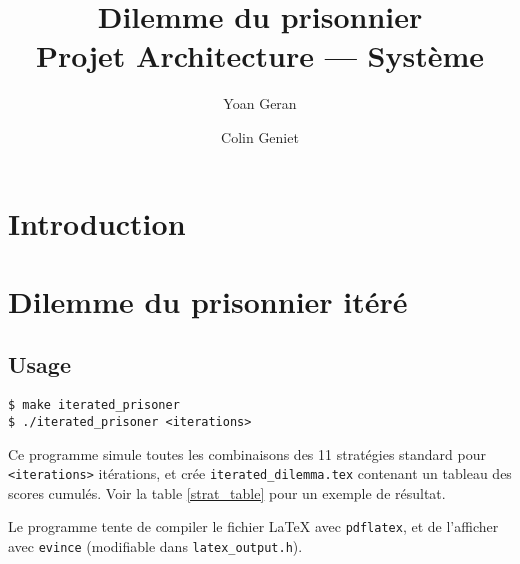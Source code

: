 \documentclass[10pt]{article}
\title{Dilemme du prisonnier \\ Projet Architecture --- Système}
\author{Yoan Geran \and Colin Geniet}
\begin{document}
\maketitle
\tableofcontents

\section*{Introduction}

\section{Dilemme du prisonnier itéré}
\subsection{Usage}
\begin{verbatim}
$ make iterated_prisoner
$ ./iterated_prisoner <iterations>
\end{verbatim}

Ce programme simule toutes les combinaisons des 11 stratégies standard pour \verb|<iterations>| itérations,
et crée \verb|iterated_dilemma.tex| contenant un tableau des scores cumulés.
Voir la table \ref{strat_table} pour un exemple de résultat.

Le programme tente de compiler le fichier \LaTeX{} avec \verb|pdflatex|, et de l'afficher avec \verb|evince|
(modifiable dans \verb|latex_output.h|).
\end{document}
